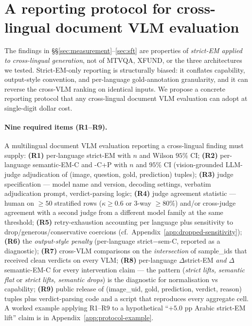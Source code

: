 \section{A reporting protocol for cross-lingual document VLM evaluation}
\label{sec:protocol}

The findings in \S\S\ref{sec:measurement}--\ref{sec:sft} are properties of \emph{strict-EM applied to cross-lingual generation}, not of MTVQA, XFUND, or the three architectures we tested. Strict-EM-only reporting is structurally biased: it conflates capability, output-style convention, and per-language gold-annotation granularity, and it can reverse the cross-VLM ranking on identical inputs. We propose a concrete reporting protocol that any cross-lingual document VLM evaluation can adopt at single-digit dollar cost.

\paragraph{Nine required items (R1--R9).}
A multilingual document VLM evaluation reporting a cross-lingual finding must supply: \textbf{(R1)} per-language strict-EM with $n$ and Wilson $95\%$ CI; \textbf{(R2)} per-language semantic-EM-C and -C+P with $n$ and $95\%$ CI (vision-grounded LLM-judge adjudication of (image, question, gold, prediction) tuples); \textbf{(R3)} judge specification --- model name and version, decoding settings, verbatim adjudication prompt, verdict-parsing logic; \textbf{(R4)} judge agreement statistic --- human on $\geq 50$ stratified rows ($\kappa \geq 0.6$ or 3-way $\geq 80\%$) and/or cross-judge agreement with a second judge from a different model family at the same threshold; \textbf{(R5)} retry-exhaustion accounting per language plus sensitivity to drop/generous/conservative coercions (cf.\ Appendix~\ref{app:dropped-sensitivity}); \textbf{(R6)} the \emph{output-style penalty} (per-language strict$-$sem-C, reported as a diagnostic); \textbf{(R7)} cross-VLM comparisons on the \emph{intersection} of sample\_ids that received clean verdicts on every VLM; \textbf{(R8)} per-language $\Delta$strict-EM \emph{and} $\Delta$semantic-EM-C for every intervention claim --- the pattern (\emph{strict lifts, semantic flat} or \emph{strict lifts, semantic drops}) is the diagnostic for normalisation vs capability; \textbf{(R9)} public release of (image\_uid, gold, prediction, verdict, reason) tuples plus verdict-parsing code and a script that reproduces every aggregate cell. A worked example applying R1--R9 to a hypothetical ``$+5.0$ pp Arabic strict-EM lift'' claim is in Appendix~\ref{app:protocol-example}.

